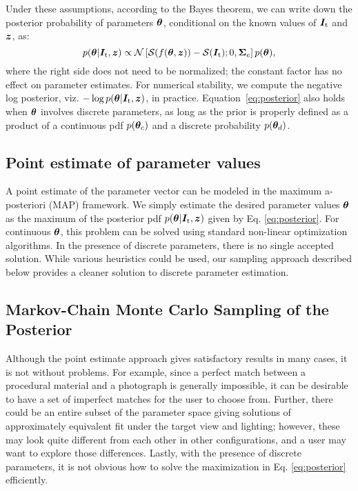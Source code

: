 Under these assumptions, according to the Bayes theorem, we can write down the posterior probability of parameters $\bm\theta$, conditional on the known values of $\bm{I}_\mathrm{t}$ and $\bm{z}$, as:
\begin{equation} 
	\label{eq:posterior}
	p(\bm\theta | \bm{I}_\mathrm{t}, \bm{z}) \propto \mathcal{N}\left[\mathcal{S}(f(\bm\theta, \bm{z})) - \mathcal{S}(\bm{I}_\mathrm{t}); 0, \bm\Sigma_e\right] p(\bm\theta),
\end{equation}
where the right side does not need to be normalized; the constant factor has no effect on parameter estimates.
For numerical stability, we compute the negative log posterior, viz. $-\log p(\bm\theta | \bm{I}_\mathrm{t}, \bm{z})$, in practice. Equation~\eqref{eq:posterior} also holds when $\bm\theta$ involves discrete parameters, as long as the prior is properly defined as a product of a continuous pdf $p(\bm\theta_c)$ and a discrete probability $p(\bm\theta_d)$.

\subsection{Point estimate of parameter values}

A point estimate of the parameter vector can be modeled in the maximum a-posteriori (MAP) framework. We simply estimate the desired parameter values $\bm\theta$ as the maximum of the posterior pdf $p(\bm\theta | \bm{I}_\mathrm{t}, \bm{z})$ given by Eq. \eqref{eq:posterior}. For continuous $\bm\theta$, this problem can be solved using standard non-linear optimization algorithms. In the presence of discrete parameters, there is no single accepted solution. While various heuristics could be used, our sampling approach described below provides a cleaner solution to discrete parameter estimation.

\subsection{Markov-Chain Monte Carlo Sampling of the Posterior}
\label{ssec:bayesian}

Although the point estimate approach gives satisfactory results in many cases, it is not without problems. For example, since a perfect match between a procedural material and a photograph is generally impossible, it can be desirable to have a set of imperfect matches for the user to choose from. Further, there could be an entire subset of the parameter space giving solutions of approximately equivalent fit under the target view and lighting; however, these may look quite different from each other in other configurations, and a user may want to explore those differences. Lastly, with the presence of discrete parameters, it is not obvious how to solve the maximization in Eq. \eqref{eq:posterior} efficiently.

